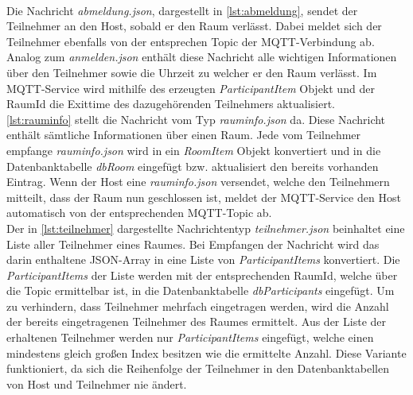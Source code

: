 \\
Die Nachricht \textit{abmeldung.json}, dargestellt in \cref{lst:abmeldung},   sendet der Teilnehmer an den Host, sobald er den Raum verlässt. Dabei meldet sich der Teilnehmer ebenfalls von der entsprechen Topic der MQTT-Verbindung ab. Analog zum \textit{anmelden.json} enthält diese Nachricht alle wichtigen Informationen über den Teilnehmer sowie die Uhrzeit zu welcher er den Raum verlässt. Im MQTT-Service wird mithilfe des erzeugten \textit{ParticipantItem} Objekt und der RaumId die Exittime des dazugehörenden Teilnehmers aktualisiert.  
\\
\cref{lst:rauminfo} stellt die Nachricht vom Typ \textit{rauminfo.json} da. Diese Nachricht enthält sämtliche Informationen über einen Raum. Jede vom Teilnehmer empfange \textit{rauminfo.json} wird in ein \textit{RoomItem} Objekt konvertiert und in die Datenbanktabelle \textit{dbRoom} eingefügt bzw. aktualisiert den bereits vorhanden Eintrag. Wenn der Host eine \textit{rauminfo.json} versendet, welche den Teilnehmern mitteilt, dass der Raum nun geschlossen ist, meldet der MQTT-Service den Host automatisch von der entsprechenden MQTT-Topic ab.
\\
Der in \cref{lst:teilnehmer} dargestellte Nachrichtentyp \textit{teilnehmer.json} beinhaltet eine Liste aller Teilnehmer eines Raumes. Bei Empfangen der Nachricht wird das darin enthaltene JSON-Array in eine Liste von \textit{ParticipantItems} konvertiert. Die \textit{ParticipantItems} der Liste werden mit der entsprechenden RaumId, welche über die Topic ermittelbar ist, in die Datenbanktabelle \textit{dbParticipants} eingefügt. Um zu verhindern, dass Teilnehmer mehrfach eingetragen werden, wird die Anzahl der bereits eingetragenen Teilnehmer des Raumes ermittelt. Aus der Liste der erhaltenen Teilnehmer werden nur \textit{ParticipantItems} eingefügt, welche einen mindestens gleich großen Index besitzen wie die ermittelte Anzahl. Diese Variante funktioniert, da sich die Reihenfolge der Teilnehmer in den Datenbanktabellen von Host und Teilnehmer nie ändert.


